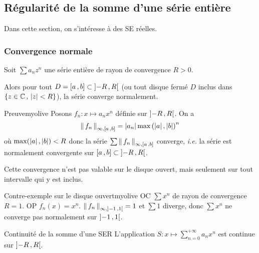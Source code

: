 \subsection{Régularité de la somme d’une série entière}

    Dans cette section, on s’intéresse à des SE réelles.

    \subsubsection{Convergence normale}

    \begin{prop}{}{}
        Soit $\sum a_n z^n$ une série entière de rayon de convergence $R > 0$.

        Alors pour tout $D = \intervalleFF{a}{b} \subset \intervalleOO{-R}{R}$ (ou tout disque fermé $D$ inclus dans $\enstq{z \in \mathbb{C}}{\abs{z} < R}$), la série converge normalement.
    \end{prop}

    \begin{demo}{Preuve}{myolive}
        Posons $f_n : x \mapsto a_n x^n$ définie sur $\intervalleOO{-R}{R}$. On a 
        \begin{align*}
            \nnorm{\infty, \intervalleFF{a}{b}}{f_n} 
            &= \abs{a_n} \max\left(\abs{a}, \abs{b}\right)^n \\
        \end{align*}
        où $\max(\abs{a}, \abs{b}) < R$ donc la série $\sum \nnorm{\infty, \intervalleFF{a}{b}}{f_n}$ converge, \textit{i.e.} la série est normalement convergente sur $\intervalleFF{a}{b} \subset \intervalleOO{-R}{R}$.
    \end{demo}

    Cette convergence n’est pas valable sur le disque ouvert, mais seulement sur tout intervalle qui y est inclus. 

    \begin{omed}{Contre-exemple sur le disque ouvert}{myolive}
        OC $\sum x^n$ de rayon de convergence $R = 1$. OP $f_n(x) = x^n$. $\nnorm{\infty, \intervalleOO{-1}{1}}{f_n} = 1$ et $\sum 1$ diverge, donc $\sum x^n$ ne converge pas normalement sur $\intervalleOO{-1}{1}$.
    \end{omed}

    \begin{coro}{Continuité de la somme d’une SER}{}
        L’application $S : x \longmapsto \sum_{n=0}^{+\infty} a_n x^n$ est continue sur $\intervalleOO{-R}{R}$.
    \end{coro}

